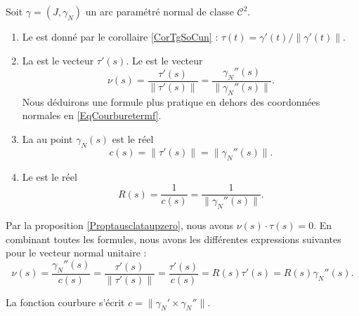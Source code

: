 \begin{definition}      \label{DefCourbureNormleUnit}
    Soit $\gamma=(J,\gamma_N)$ un arc paramétré normal de classe $\mathcal{C}^2$. 
    \begin{enumerate}
        \item
            Le  est donné par le corollaire \ref{CorTgSoCun} : \( \tau(t)=\gamma'(t)/\| \gamma'(t) \|\).
        \item
    La  est le vecteur $\tau'(s)$. Le  est le vecteur
    \begin{equation}
        \nu(s)=\frac{ \tau'(s) }{ \| \tau'(s) \| }=\frac{ \gamma_N''(s) }{ \| \gamma_N''(s) \| }.
    \end{equation}
    Nous déduirons une formule plus pratique en dehors des coordonnées normales en \eqref{EqCourburetermf}.
\item
    La  au point $\gamma_N(s)$ est le réel
    \begin{equation}
        c(s)=\| \tau'(s) \|=\| \gamma_N''(s) \|.
    \end{equation}
\item
    Le  est le réel
    \begin{equation}
        R(s)=\frac{1}{ c(s) }=\frac{1}{ \| \gamma_N''(s) \| }.
    \end{equation}
    \end{enumerate}
\end{definition}

Par la proposition \ref{Proptausclataupzero}, nous avons $\nu(s)\cdot\tau(s)=0$. En combinant toutes les formules, nous avons les différentes expressions suivantes pour le vecteur normal unitaire :
\begin{equation}        \label{Eq0908nufractauRc}
    \nu(s)=\frac{ \gamma_N''(s) }{ c(s) }=\frac{ \tau'(s) }{ \| \tau'(s) \| }=\frac{ \tau'(s) }{ c(s) }=R(s)\tau'(s)=R(s)\gamma_N''(s).
\end{equation}

\begin{proposition}
    La fonction courbure s'écrit $c=\| \gamma_N'\times \gamma_N'' \|$.
\end{proposition}

